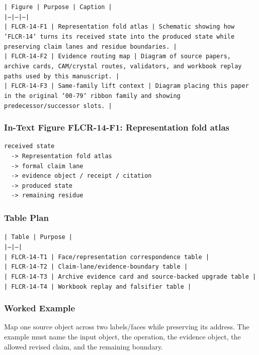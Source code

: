 \documentclass[11pt]{article}
\begin{document}
\noindent\texttt{| Figure | Purpose | Caption |}\\
\noindent\texttt{|---|---|---|}\\
\noindent\texttt{| FLCR-14-F1 | Representation fold atlas | Schematic showing how `FLCR-14` turns its received state into the produced state while preserving claim lanes and residue boundaries. |}\\
\noindent\texttt{| FLCR-14-F2 | Evidence routing map | Diagram of source papers, archive cards, CAM/crystal routes, validators, and workbook replay paths used by this manuscript. |}\\
\noindent\texttt{| FLCR-14-F3 | Same-family lift context | Diagram placing this paper in the original `00-79` ribbon family and showing predecessor/successor slots. |}\\

\subsubsection*{In-Text Figure FLCR-14-F1: Representation fold atlas}

\begin{verbatim}
received state
  -> Representation fold atlas
  -> formal claim lane
  -> evidence object / receipt / citation
  -> produced state
  -> remaining residue
\end{verbatim}

\subsubsection*{Table Plan}

\noindent\texttt{| Table | Purpose |}\\
\noindent\texttt{|---|---|}\\
\noindent\texttt{| FLCR-14-T1 | Face/representation correspondence table |}\\
\noindent\texttt{| FLCR-14-T2 | Claim-lane/evidence-boundary table |}\\
\noindent\texttt{| FLCR-14-T3 | Archive evidence card and source-backed upgrade table |}\\
\noindent\texttt{| FLCR-14-T4 | Workbook replay and falsifier table |}\\

\subsubsection*{Worked Example}

Map one source object across two labels/faces while preserving its address. The example must name the input object, the operation,
the evidence object, the allowed revised claim, and the remaining boundary.
\end{document}
